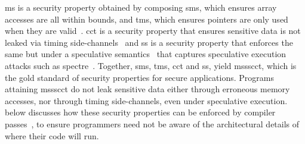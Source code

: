 \documentclass[dvipsnames,conference]{IEEEtran}
\theoremstyle{definition}
\begin{document}

\gls*{ms} is a security property obtained by composing \gls*{sms}, which ensures array accesses are all within bounds, and \gls*{tms}, which ensures pointers are only used when they are valid~\cite{azevedo2018meaningsofms,jim2002cyclone,necula2005ccured,nagarakatte2010cets,nagarakatte2009soft,akritidis2009baggy,michael2023mswasm}.
\gls*{cct} is a security property that ensures sensitive data is not leaked via timing side-channels~\cite{kocher1996timing} and \gls*{ss} is a security property that enforces the same but under a speculative semantics~\cite{guarnieri2018spectector,fabian2022automatic} that captures speculative execution attacks such as spectre~\cite{kocher2019spectre}.
Together, \gls*{sms}, \gls*{tms}, \gls*{cct} and \gls*{ss}, yield \gls*{mssscct}, which is the gold standard of security properties for secure applications.
Programs attaining \gls*{mssscct} do not leak sensitive data either through erroneous memory accesses, nor through timing side-channels, even under speculative execution.
 below discusses how these security properties can be enforced by compiler passes~\cite{bond2017vale,almeida2017jasmin}, to ensure programmers need not be aware of the architectural details of where their code will run.
\end{document}

